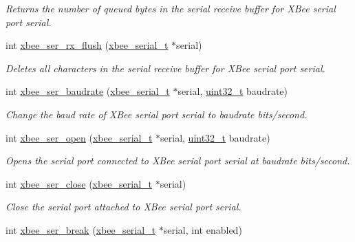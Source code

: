 \begin{DoxyCompactItemize}
\begin{DoxyCompactList}\small\item\em Returns the number of queued bytes in the serial receive buffer for X\-Bee serial port {\itshape serial}. \end{DoxyCompactList}\item 
int \hyperlink{group__hal__dos_ga98a6d5ceb5e1445e8ef82ccaa65a8c15}{xbee\-\_\-ser\-\_\-rx\-\_\-flush} (\hyperlink{structxbee__serial__t}{xbee\-\_\-serial\-\_\-t} $\ast$serial)
\begin{DoxyCompactList}\small\item\em Deletes all characters in the serial receive buffer for X\-Bee serial port {\itshape serial}. \end{DoxyCompactList}\item 
int \hyperlink{group__hal__dos_gab3c12543a07e0669b672c5cab54b0926}{xbee\-\_\-ser\-\_\-baudrate} (\hyperlink{structxbee__serial__t}{xbee\-\_\-serial\-\_\-t} $\ast$serial, \hyperlink{group__hal__dos_ga09a1e304d66d35dd47daffee9731edaa}{uint32\-\_\-t} baudrate)
\begin{DoxyCompactList}\small\item\em Change the baud rate of X\-Bee serial port {\itshape serial} to {\itshape baudrate} bits/second. \end{DoxyCompactList}\item 
int \hyperlink{group__hal__dos_gaa615a221dd69c17ee2989c281f2bf04a}{xbee\-\_\-ser\-\_\-open} (\hyperlink{structxbee__serial__t}{xbee\-\_\-serial\-\_\-t} $\ast$serial, \hyperlink{group__hal__dos_ga09a1e304d66d35dd47daffee9731edaa}{uint32\-\_\-t} baudrate)
\begin{DoxyCompactList}\small\item\em Opens the serial port connected to X\-Bee serial port {\itshape serial} at {\itshape baudrate} bits/second. \end{DoxyCompactList}\item 
int \hyperlink{group__hal__dos_ga48b9d743a446074ea6abacd0de24044d}{xbee\-\_\-ser\-\_\-close} (\hyperlink{structxbee__serial__t}{xbee\-\_\-serial\-\_\-t} $\ast$serial)
\begin{DoxyCompactList}\small\item\em Close the serial port attached to X\-Bee serial port {\itshape serial}. \end{DoxyCompactList}\item 
int \hyperlink{group__hal__dos_ga6ae89792415a7ac8b45b56188eb9eeb4}{xbee\-\_\-ser\-\_\-break} (\hyperlink{structxbee__serial__t}{xbee\-\_\-serial\-\_\-t} $\ast$serial, int enabled)

\end{DoxyCompactItemize}

